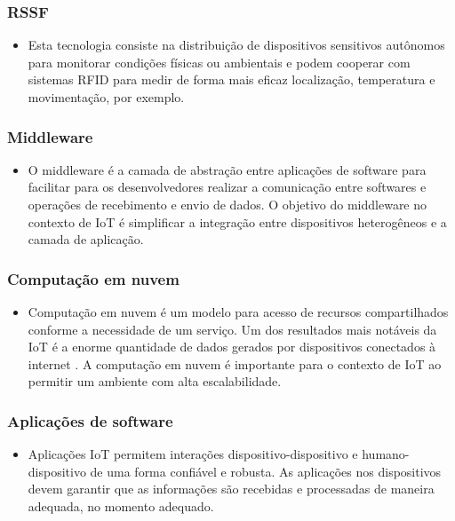 	\subsubsection{\acrfull{RSSF}}
		\begin{itemize}
			\item Esta tecnologia consiste na distribuição de dispositivos sensitivos autônomos para monitorar condições físicas ou
			ambientais e podem cooperar com sistemas \acrshort{RFID} para medir de forma mais eficaz localização, temperatura e movimentação, por exemplo.
			\cite{IOTS}
		\end{itemize}
	\subsubsection{Middleware}
		\begin{itemize}
			\item O middleware é a camada de abstração entre aplicações de software para facilitar para os desenvolvedores
			 realizar a comunicação entre softwares e operações de recebimento e envio de dados. O objetivo do middleware no contexto
			  de \acrshort{IoT} é simplificar a integração entre dispositivos heterogêneos e a camada de aplicação.
		\end{itemize}
	\subsubsection{Computação em nuvem}
		\begin{itemize}
			\item Computação em nuvem é um modelo para acesso de recursos compartilhados conforme a necessidade de um serviço. Um dos resultados mais notáveis
			da \acrshort{IoT} é a enorme quantidade de dados gerados por dispositivos conectados à internet \cite{IOTV}. A computação em nuvem é importante para o contexto de \acrlong{IoT}
			ao permitir um ambiente com alta escalabilidade.
		\end{itemize}
	\subsubsection{Aplicações de software}
		\begin{itemize}
			\item Aplicações \acrshort{IoT} permitem interações dispositivo-dispositivo e humano-dispositivo de uma forma confiável e robusta.
			As aplicações nos dispositivos devem garantir que as informações são recebidas e processadas de maneira adequada, no momento
			adequado.
		\end{itemize}

